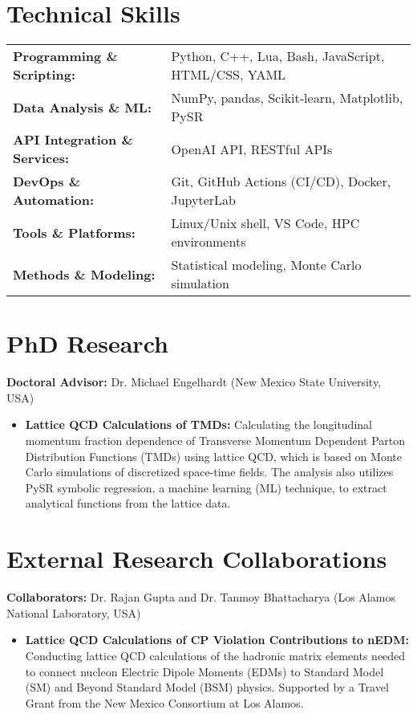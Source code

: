 \documentclass[11pt]{article}
\begin{document}
\section*{Technical Skills}
\vspace{-0.5em}
\begin{tabularx}{\textwidth}{@{}lX@{}}
\textbf{Programming \& Scripting:}    & Python, C++, Lua, Bash, JavaScript, HTML/CSS, YAML \\
\textbf{Data Analysis \& ML:}         & NumPy, pandas, Scikit‑learn, Matplotlib, PySR \\
\textbf{API Integration \& Services:}& OpenAI API, RESTful APIs \\
\textbf{DevOps \& Automation:}        & Git, GitHub Actions (CI/CD), Docker, JupyterLab \\
\textbf{Tools \& Platforms:}          & Linux/Unix shell, VS Code, HPC environments \\
\textbf{Methods \& Modeling:}         & Statistical modeling, Monte Carlo simulation \\
\end{tabularx}


\section*{PhD Research}
\vspace{-0.3em}
\textbf{Doctoral Advisor:} Dr. Michael Engelhardt (New Mexico State University, USA)
\begin{itemize}
    \item \textbf{Lattice QCD Calculations of TMDs:} Calculating the longitudinal momentum fraction dependence of Transverse Momentum Dependent Parton Distribution Functions (TMDs) using lattice QCD, which is based on Monte Carlo simulations of discretized space-time fields. The analysis also utilizes PySR symbolic regression, a machine learning (ML) technique, to extract analytical functions from the lattice data.
\end{itemize}

\section*{External Research Collaborations}
\vspace{-0.3em}
\textbf{Collaborators:} Dr. Rajan Gupta and Dr. Tanmoy Bhattacharya (Los Alamos National Laboratory, USA)
\begin{itemize}
    \item \textbf{Lattice QCD Calculations of CP Violation Contributions to nEDM:} Conducting lattice QCD calculations of the hadronic matrix elements needed to connect nucleon Electric Dipole Moments (EDMs) to Standard Model (SM) and Beyond Standard Model (BSM) physics. Supported by a Travel Grant from the New Mexico Consortium at Los Alamos.
\end{itemize}
\end{document}
